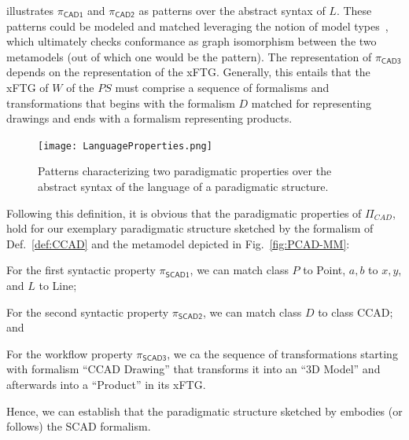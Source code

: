 \label{fig:LanguageProperties} illustrates $\pi_{\mathsf{CAD1}}$ and
$\pi_{\mathsf{CAD2}}$ as patterns over the abstract syntax of $L$. These
patterns could be modeled and matched leveraging the notion of model
types~\cite{steel2007model}, which ultimately checks conformance as graph
isomorphism between the two metamodels (out of which one would be the pattern).
The representation of $\pi_{\mathsf{CAD3}}$ depends on the representation of the
xFTG. Generally, this entails that the xFTG of $W$ of the $PS$ must comprise a
sequence of formalisms and transformations that begins with the formalism $D$
matched for representing drawings and ends with a formalism representing
products. 

\begin{figure}[t]
   \centering \texttt{[image: LanguageProperties.png]}
   \caption{Patterns characterizing two paradigmatic properties over the 
abstract 
   syntax of the language of a paradigmatic structure.}  
   \vspace{-1em}
   \label{fig:LanguageProperties}
\end{figure}

\begin{Example}
\end{Example}

Following this definition, it is obvious that the paradigmatic properties of
$\Pi_{CAD}$, hold for our exemplary \CCad paradigmatic structure sketched by the
formalism of Def.~\ref{def:CCAD} and the metamodel depicted in
Fig.~\ref{fig:PCAD-MM}:
\begin{inparaenum}[(1)]
\item For the first syntactic property $\pi_{\mathsf{SCAD1}}$, we can match
class $P$ to Point, $a,b$ to $x,y$, and $L$ to Line;
\item For the second syntactic property $\pi_{\mathsf{SCAD2}}$, we can match
class $D$ to class CCAD; and
\item For the workflow property $\pi_{\mathsf{SCAD3}}$, we ca the sequence of
transformations starting with formalism ``CCAD Drawing'' that transforms it into
an ``3D Model'' and afterwards into a ``Product'' in its xFTG.
\end{inparaenum}
Hence, we can establish that the paradigmatic structure sketched by \CCad
embodies (or follows) the SCAD formalism.
